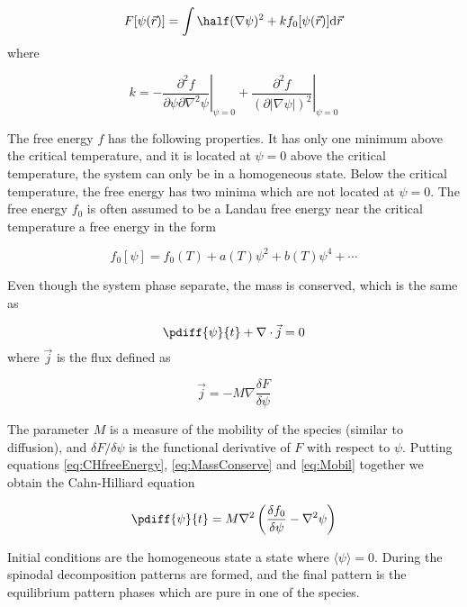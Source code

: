 \begin{equation}
\label{eq:CHfreeEnergy}
  F[\psi(\vec{r})] = \int \half (\nabla\psi)^2 + k f_0[\psi(\vec{r})]
                     \mathrm{d}\vec{r}
\end{equation}
where

\[
  k = - \left. \frac{\partial^2 f}{\partial \psi\partial\nabla^2 \psi}
             \right|_{\psi=0}
           + \left. \frac{\partial^2 f}{(\partial|\nabla\psi|)^2}
             \right|_{\psi=0}
\]

The free energy $f$ has the following properties. It has only one
minimum above the critical temperature, and it is located at $\psi =
0$ \ie above the critical temperature, the system can only be in a
homogeneous state. Below the critical temperature, the free energy has
two minima which are not located at $\psi = 0$. The free energy $f_0$ is
often assumed to be a Landau free energy near the critical temperature
\ie a free energy in the form

\[
  f_0[\psi] = f_0(T) + a(T)\psi^2 + b(T)\psi^4 + \cdots
\]

Even though the system phase separate, the mass is conserved, which is
the same as

\begin{equation}
\label{eq:MassConserve}
  \pdiff{\psi}{t} + \nabla\cdot \vec{j} = 0
\end{equation}
where $\vec{j}$ is the flux defined as

\begin{equation}
\label{eq:Mobil}
  \vec{j} = -M \nabla \frac{\delta F}{\delta \psi}
\end{equation}

The parameter $M$ is a measure of the mobility of the species (similar to
diffusion), and $\delta F/\delta \psi$ is the functional derivative of
$F$ with respect to $\psi$. Putting equations \eqref{eq:CHfreeEnergy},
\eqref{eq:MassConserve} and \eqref{eq:Mobil} together we obtain the
Cahn-Hilliard equation \ie

\begin{equation}
\label{eq:CahnHilliard}
  \pdiff{\psi}{t} = M\nabla^2 \left(\frac{\delta f_0}{\delta\psi} -
                    \nabla^2\psi\right)
\end{equation}

Initial conditions are the homogeneous state \ie a state where $\langle
\psi \rangle = 0$. During the spinodal decomposition patterns are
formed, and the final pattern is the equilibrium pattern \ie phases
which are pure in one of the species.

